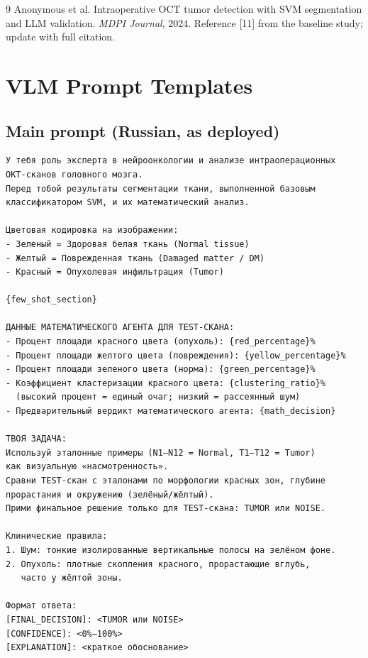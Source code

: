 \documentclass[11pt]{article}
\begin{document}
\begin{thebibliography}{9}
Anonymous et al.
\newblock Intraoperative OCT tumor detection with SVM segmentation and LLM validation.
\newblock \emph{MDPI Journal}, 2024.
\newblock Reference [11] from the baseline study; update with full citation.
\end{thebibliography}

\appendix
\section{VLM Prompt Templates}
\label{app:prompts}

\subsection{Main prompt (Russian, as deployed)}
\begin{lstlisting}[style=prompt,basicstyle=\footnotesize\ttfamily]
У тебя роль эксперта в нейроонкологии и анализе интраоперационных
ОКТ-сканов головного мозга.
Перед тобой результаты сегментации ткани, выполненной базовым
классификатором SVM, и их математический анализ.

Цветовая кодировка на изображении:
- Зеленый = Здоровая белая ткань (Normal tissue)
- Желтый = Поврежденная ткань (Damaged matter / DM)
- Красный = Опухолевая инфильтрация (Tumor)

{few_shot_section}

ДАННЫЕ МАТЕМАТИЧЕСКОГО АГЕНТА ДЛЯ TEST-СКАНА:
- Процент площади красного цвета (опухоль): {red_percentage}%
- Процент площади желтого цвета (повреждения): {yellow_percentage}%
- Процент площади зеленого цвета (норма): {green_percentage}%
- Коэффициент кластеризации красного цвета: {clustering_ratio}%
  (высокий процент = единый очаг; низкий = рассеянный шум)
- Предварительный вердикт математического агента: {math_decision}

ТВОЯ ЗАДАЧА:
Используй эталонные примеры (N1–N12 = Normal, T1–T12 = Tumor)
как визуальную «насмотренность».
Сравни TEST-скан с эталонами по морфологии красных зон, глубине
прорастания и окружению (зелёный/жёлтый).
Прими финальное решение только для TEST-скана: TUMOR или NOISE.

Клинические правила:
1. Шум: тонкие изолированные вертикальные полосы на зелёном фоне.
2. Опухоль: плотные скопления красного, прорастающие вглубь,
   часто у жёлтой зоны.

Формат ответа:
[FINAL_DECISION]: <TUMOR или NOISE>
[CONFIDENCE]: <0%–100%>
[EXPLANATION]: <краткое обоснование>
\end{lstlisting}
\end{document}
